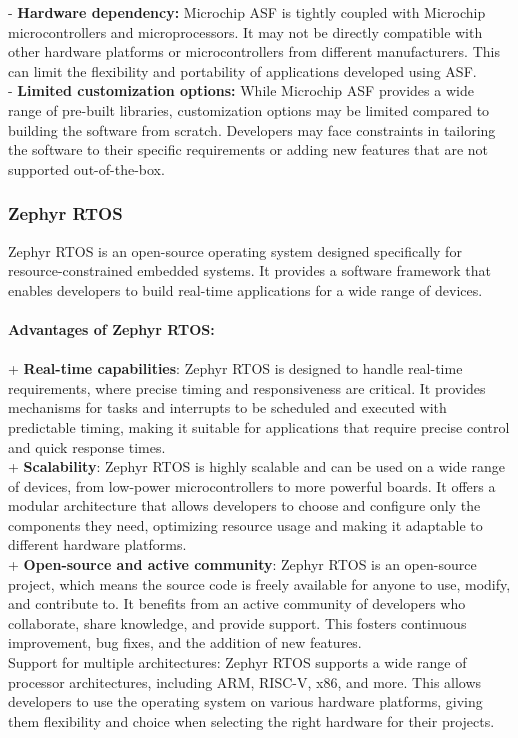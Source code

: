 - \textbf{Hardware dependency:} Microchip ASF is tightly coupled with Microchip microcontrollers and microprocessors. It may not be directly compatible with other hardware platforms or microcontrollers from different manufacturers. This can limit the flexibility and portability of applications developed using ASF. \\
- \textbf{Limited customization options:} While Microchip ASF provides a wide range of pre-built libraries, customization options may be limited compared to building the software from scratch. Developers may face constraints in tailoring the software to their specific requirements or adding new features that are not supported out-of-the-box.


\pagebreak
\subsubsection{Zephyr RTOS}
Zephyr RTOS is an open-source operating system designed specifically for resource-constrained embedded systems. It provides a software framework that enables developers to build real-time applications for a wide range of devices. \\\\
\textbf{Advantages of Zephyr RTOS: }\\\\
+ \textbf{Real-time capabilities}: Zephyr RTOS is designed to handle real-time requirements, where precise timing and responsiveness are critical. It provides mechanisms for tasks and interrupts to be scheduled and executed with predictable timing, making it suitable for applications that require precise control and quick response times. \\
+ \textbf{Scalability}: Zephyr RTOS is highly scalable and can be used on a wide range of devices, from low-power microcontrollers to more powerful boards. It offers a modular architecture that allows developers to choose and configure only the components they need, optimizing resource usage and making it adaptable to different hardware platforms. \\
+ \textbf{Open-source and active community}: Zephyr RTOS is an open-source project, which means the source code is freely available for anyone to use, modify, and contribute to. It benefits from an active community of developers who collaborate, share knowledge, and provide support. This fosters continuous improvement, bug fixes, and the addition of new features. \\
Support for multiple architectures: Zephyr RTOS supports a wide range of processor architectures, including ARM, RISC-V, x86, and more. This allows developers to use the operating system on various hardware platforms, giving them flexibility and choice when selecting the right hardware for their projects. \\\\
